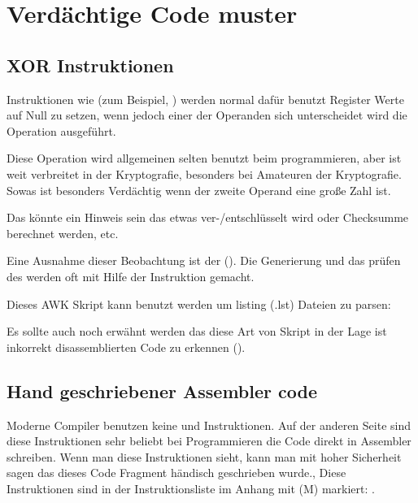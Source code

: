 \section{Verd\"achtige Code muster}

\subsection{XOR Instruktionen}

Instruktionen wie  (zum Beispiel, )
werden normal daf\"ur benutzt Register Werte auf Null zu setzen, wenn jedoch
einer der Operanden sich unterscheidet wird die  Operation 
ausgef\"uhrt.

Diese Operation wird allgemeinen selten benutzt beim programmieren, aber ist
weit verbreitet in der Kryptografie, besonders bei Amateuren der Kryptografie.
Sowas ist besonders Verd\"achtig wenn der zweite Operand eine große Zahl ist.

Das k\"onnte ein Hinweis sein das etwas ver-/entschl\"usselt wird oder Checksumme berechnet werden, etc.

Eine Ausnahme dieser Beobachtung ist der  (). 
Die Generierung und das pr\"ufen des  werden oft mit Hilfe der \XOR Instruktion gemacht. 


Dieses AWK Skript kann benutzt werden um \IDA{} listing (.lst) Dateien zu parsen:



Es sollte auch noch erw\"ahnt werden das diese Art von Skript in der Lage ist inkorrekt disassemblierten Code zu erkennen
().

\subsection{Hand geschriebener Assembler code}


Moderne Compiler benutzen keine  und  Instruktionen.
Auf der anderen Seite sind diese Instruktionen sehr beliebt bei Programmieren die Code direkt in Assembler schreiben.
Wenn man diese Instruktionen sieht, kann man mit hoher Sicherheit sagen das dieses Code Fragment h\"andisch geschrieben wurde.,
Diese Instruktionen sind in der Instruktionsliste im Anhang mit (M) markiert: .

